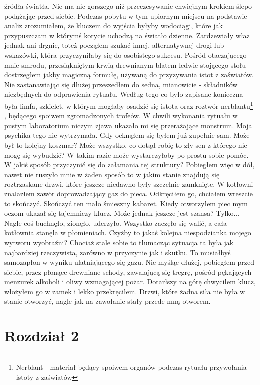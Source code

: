 \documentclass[12pt,a4paper]{report}
\begin{document}
źródła światła. Nie ma nic gorszego niż przeczesywanie chwiejnym krokiem ślepo podążając przed siebie. Podczas pobytu w tym upiornym miejscu na podstawie analiz zrozumiałem, że kluczem do wyjścia byłyby wodociągi, które jak przypuszczam w którymś korycie uchodzą na światło dzienne. Zardzewiały właz jednak ani drgnie, toteż począłem szukać innej, alternatywnej drogi lub wskazówki, która przyczyniłaby się do osobistego sukcesu. Pośród otaczającego mnie smrodu, przesiąkniętym krwią drewnianym blatem ledwie stojącego stołu dostrzegłem jakby magiczną formułę, używaną do przyzywania istot z zaświatów. Nie zastanawiając się dłużej przeszedłem do sedna, mianowicie - składników niezbędnych do odprawienia rytuału. Według tego co było zapisane konieczna była limfa, szkielet, w którym mogłaby osadzić się istota oraz roztwór nerblantu\footnote{Nerblant - materiał będący spoiwem organów podczas rytuału przywołania istoty z zaświatów  } , będącego spoiwem zgromadzonych trofeów. W chwili wykonania rytuału w pustym laboratorium niczym zjawa ukazało mi się przerażające monstrum. Moja psychika tego nie wytrzymała. Gdy ocknąłem się byłem już zupełnie sam. Może był to kolejny koszmar? Może wszystko, co dotąd robię to zły sen z którego nie mogę się wybudzić? W takim razie może wystarczyłoby po prostu sobie pomóc. W jakiś sposób przyczynić się do załamania tej struktury? Pobiegłem więc w dół, nawet nie ruszyło mnie w żaden sposób to w jakim stanie znajdują się roztrzaskane drzwi, które jeszcze niedawno były szczelnie zamknięte. W kotłowni znalazłem zawór doprowadzający gaz do pieca. Odkręciłem go, chciałem wreszcie to skończyć. Skończyć ten mało śmieszny kabaret. Kiedy otworzyłem piec mym oczom ukazał się tajemniczy klucz. Może jednak jeszcze jest szansa? Tylko... Nagle coś buchnęło, zionęło, uderzyło. Wszystko zaczęło się walić, a cała kotłownia stanęła w płomieniach. Czyżby to jakaś kolejna niespodzianka mojego wytworu wyobraźni? Chociaż stale sobie to tłumacząc sytuacja ta była jak najbardziej rzeczywista, zarówno w przyczynie jak i skutku. To musiałbyś samozapłon w wyniku ulatniającego się gazu. Nie myśląc dłużej, pobiegłem przed siebie, przez płonące drewniane schody, zawalającą się tregrę, pośród pękających menzurek alkoholi i oliwy wzmagającej pożar. Dotarłszy na górę chwyciłem klucz, włożyłem go w zamek i lekko przekręciłem. Drzwi, które żadna siła nie była w stanie otworzyć, nagle jak na zawołanie stały przede mną otworem.  
 
\section{\textbf{Rozdział 2}}
\end{document}
